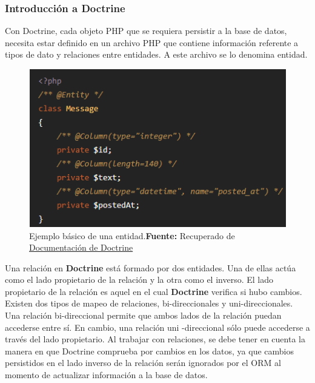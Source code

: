 \documentclass{article}
\begin{document}
\subsubsection{Introducción a Doctrine}%
\label{ssub:introducción_doctrine}
Con Doctrine, cada objeto PHP que se requiera persistir a la base de datos, necesita estar definido en un archivo PHP que
contiene información referente a tipos de dato y relaciones entre entidades. A este archivo se lo denomina entidad.

\begin{figure}[h]
    \includegraphics[width=1\linewidth]{image/entidad-doctrine.png}
    \caption{Ejemplo básico de una entidad.\newline \textbf{Fuente:} Recuperado de \href{https://www.doctrine-project.org/
    projects/doctrine-orm/en/2.6/reference/basic-mapping.html}{Documentación de Doctrine}}%
    \label{fig:image/entidad-doctrine}
\end{figure}
Una relación en \textbf{Doctrine} está formado por dos entidades. Una de ellas actúa como el lado propietario de la relación y la otra como el inverso\@.
El lado propietario de la relación es aquel en el cual \textbf{Doctrine} verifica si hubo cambios.
Existen dos tipos de mapeo de relaciones, bi-direccionales y uni-direccionales\@.
Una relación bi-direccional permite que ambos lados de la relación puedan accederse entre sí\@. En cambio, una relación uni
-direccional sólo puede accederse a través del lado propietario\@.
Al trabajar con relaciones, se debe tener en cuenta la manera en que Doctrine comprueba por cambios en los datos, ya que cambios persistidos en el lado
inverso de la relación serán ignorados por el ORM al momento de actualizar información a la base de datos.
\end{document}

